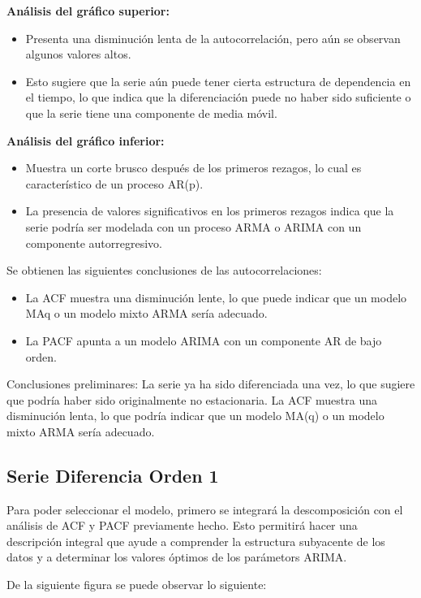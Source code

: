 \textbf{Análisis del gráfico superior:}
\begin{itemize}
	\item Presenta una disminución lenta de la autocorrelación, pero aún se observan algunos valores altos.
	\item Esto sugiere que la serie aún puede tener cierta estructura de dependencia en el tiempo, lo que indica que la diferenciación puede no haber sido suficiente o que la serie tiene una componente de media móvil. 
\end{itemize}

\textbf{Análisis del gráfico inferior:}
\begin{itemize}
	\item Muestra un corte brusco después de los primeros rezagos, lo cual es característico de un proceso AR(p).
	\item  La presencia de valores significativos en los primeros rezagos indica que la serie podría ser modelada con un proceso ARMA o ARIMA con un componente autorregresivo.
\end{itemize}

Se obtienen las siguientes conclusiones de las autocorrelaciones:
\begin{itemize}
	\item La ACF muestra una disminución lente, lo que puede indicar que un modelo MAq o un modelo mixto ARMA sería adecuado.
	\item La PACF apunta a un modelo ARIMA con un componente AR de bajo orden.

\end{itemize}
Conclusiones preliminares:
La serie ya ha sido diferenciada una vez, lo que sugiere que podría haber sido originalmente no estacionaria.
La ACF muestra una disminución lenta, lo que podría indicar que un modelo MA(q) o un modelo mixto ARMA sería adecuado.

\subsection{Serie Diferencia Orden 1}

Para poder seleccionar el modelo, primero se integrará la descomposición con el análisis de ACF y PACF previamente hecho.
Esto permitirá hacer una descripción integral que ayude a comprender la estructura subyacente de los datos y a determinar los valores óptimos de los parámetors ARIMA.

De la siguiente figura se puede observar lo siguiente:

